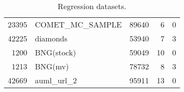 \begin{table}[h!]
\begin{tabular}{rlrrr}
     23395 &     COMET\_MC\_SAMPLE &        89640 &                6 &                0 \\
     42225 &            diamonds &        53940 &                7 &                3 \\
      1200 &          BNG(stock) &        59049 &               10 &                0 \\
      1213 &             BNG(mv) &        78732 &                8 &                3 \\
     42669 &          auml\_url\_2 &        95911 &               13 &                0 \\
\bottomrule
\end{tabular}
\caption{Regression datasets.}
\label{tab:regression_data}
\end{table}
